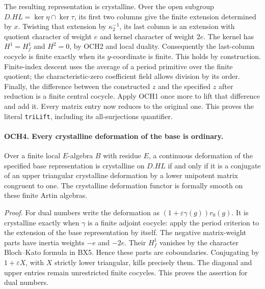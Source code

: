 \documentclass[11pt,a4paper]{article}
\numberwithin{equation}{section}
\theoremstyle{remark}\newtheorem{remark}[theorem]{Remark}
\begin{document}
The resulting representation is crystalline.  Over the open subgroup
\(D.HL=\ker\eta\cap\ker\tau\), its first two columns give the
finite extension determined by \(x\).  Twisting that extension by
\(\kappa_2^{-1}\), its last column is an extension with quotient
character of weight \(e\) and kernel character of weight \(2e\).
The kernel has \(H^1=H^1_f\) and \(H^2=0\), by OCH2 and
local duality.  Consequently the last-column cocycle is finite
exactly when its \(y\)-coordinate is finite.  This holds by
construction.  Finite-index descent uses the average of a period
primitive over the finite quotient; the characteristic-zero
coefficient field allows division by its order.
Finally, the difference between the constructed \(z\) and the
specified \(z\) after reduction is a finite central cocycle.
Apply OCH1 once more to lift that difference and add it.  Every
matrix entry now reduces to the original one.  This proves the
literal \texttt{tri\allowbreak Lift}, including its all-surjections quantifier.

\paragraph{OCH4. Every crystalline deformation of the base is ordinary.}
\label{claim:OCH4}
Over a finite local \(E\)-algebra \(B\) with residue \(E\),
a continuous deformation of the specified base representation is
crystalline on \(D.HL\) if and only if it is a conjugate of an
upper triangular crystalline deformation by a lower unipotent matrix
congruent to one.  The crystalline deformation functor is formally
smooth on these finite Artin algebras.

\emph{Proof.}
For dual numbers write the deformation as
\((1+\varepsilon\gamma(g))r_0(g)\).  It is crystalline exactly
when \(\gamma\) is a finite adjoint cocycle: apply the period
criterion to the extension of the base representation by itself.
The negative matrix-weight parts have inertia weights \(-e\)
and \(-2e\).  Their \(H^1_f\) vanishes by the character
Bloch--Kato formula in BX5.  Hence these parts are coboundaries.
Conjugating by \(1+\varepsilon X\), with \(X\) strictly lower
triangular, kills precisely them.  The diagonal and upper entries
remain unrestricted finite cocycles.  This proves the assertion
for dual numbers.
\end{document}
